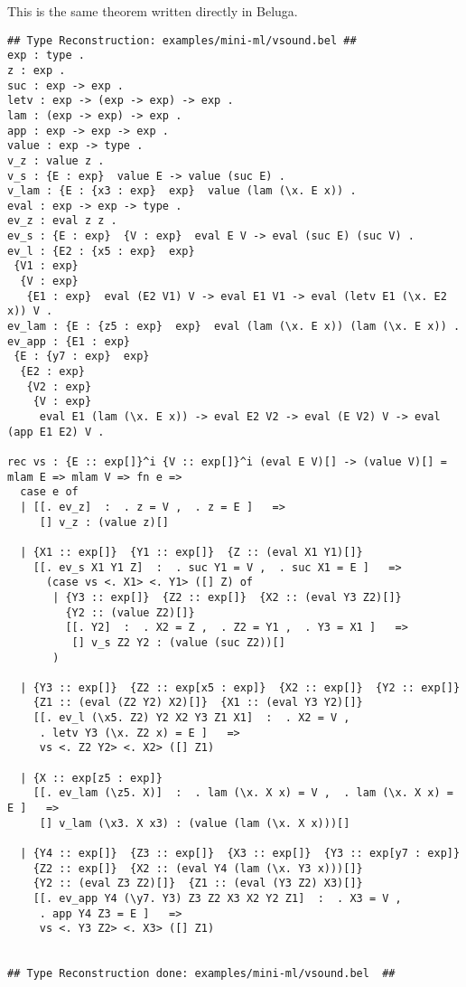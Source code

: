 \documentclass[12pt]{article}
\begin{document}
This is the same theorem written directly in \textmd{Beluga}.
\footnotesize\begin{verbatim}
## Type Reconstruction: examples/mini-ml/vsound.bel ##
exp : type .
z : exp .
suc : exp -> exp .
letv : exp -> (exp -> exp) -> exp .
lam : (exp -> exp) -> exp .
app : exp -> exp -> exp .
value : exp -> type .
v_z : value z .
v_s : {E : exp}  value E -> value (suc E) .
v_lam : {E : {x3 : exp}  exp}  value (lam (\x. E x)) .
eval : exp -> exp -> type .
ev_z : eval z z .
ev_s : {E : exp}  {V : exp}  eval E V -> eval (suc E) (suc V) .
ev_l : {E2 : {x5 : exp}  exp} 
 {V1 : exp} 
  {V : exp} 
   {E1 : exp}  eval (E2 V1) V -> eval E1 V1 -> eval (letv E1 (\x. E2 x)) V .
ev_lam : {E : {z5 : exp}  exp}  eval (lam (\x. E x)) (lam (\x. E x)) .
ev_app : {E1 : exp} 
 {E : {y7 : exp}  exp} 
  {E2 : exp} 
   {V2 : exp} 
    {V : exp} 
     eval E1 (lam (\x. E x)) -> eval E2 V2 -> eval (E V2) V -> eval (app E1 E2) V .

rec vs : {E :: exp[]}^i {V :: exp[]}^i (eval E V)[] -> (value V)[] = 
mlam E => mlam V => fn e => 
  case e of 
  | [[. ev_z]  :  . z = V ,  . z = E ]   => 
     [] v_z : (value z)[]
  
  | {X1 :: exp[]}  {Y1 :: exp[]}  {Z :: (eval X1 Y1)[]}
    [[. ev_s X1 Y1 Z]  :  . suc Y1 = V ,  . suc X1 = E ]   => 
      (case vs <. X1> <. Y1> ([] Z) of 
       | {Y3 :: exp[]}  {Z2 :: exp[]}  {X2 :: (eval Y3 Z2)[]} 
         {Y2 :: (value Z2)[]}
         [[. Y2]  :  . X2 = Z ,  . Z2 = Y1 ,  . Y3 = X1 ]   => 
          [] v_s Z2 Y2 : (value (suc Z2))[]
       )
  
  | {Y3 :: exp[]}  {Z2 :: exp[x5 : exp]}  {X2 :: exp[]}  {Y2 :: exp[]} 
    {Z1 :: (eval (Z2 Y2) X2)[]}  {X1 :: (eval Y3 Y2)[]}
    [[. ev_l (\x5. Z2) Y2 X2 Y3 Z1 X1]  :  . X2 = V ,
     . letv Y3 (\x. Z2 x) = E ]   => 
     vs <. Z2 Y2> <. X2> ([] Z1)
  
  | {X :: exp[z5 : exp]}
    [[. ev_lam (\z5. X)]  :  . lam (\x. X x) = V ,  . lam (\x. X x) = E ]   => 
     [] v_lam (\x3. X x3) : (value (lam (\x. X x)))[]
  
  | {Y4 :: exp[]}  {Z3 :: exp[]}  {X3 :: exp[]}  {Y3 :: exp[y7 : exp]} 
    {Z2 :: exp[]}  {X2 :: (eval Y4 (lam (\x. Y3 x)))[]} 
    {Y2 :: (eval Z3 Z2)[]}  {Z1 :: (eval (Y3 Z2) X3)[]}
    [[. ev_app Y4 (\y7. Y3) Z3 Z2 X3 X2 Y2 Z1]  :  . X3 = V ,
     . app Y4 Z3 = E ]   => 
     vs <. Y3 Z2> <. X3> ([] Z1)
  

## Type Reconstruction done: examples/mini-ml/vsound.bel  ##

\end{verbatim}
\end{document}
